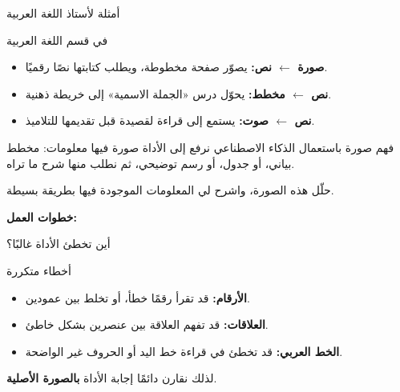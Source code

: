 \documentclass[aspectratio=169, 11pt, xcolor={table}]{beamer}
\begin{document}
\begin{frame}{أمثلة لأستاذ اللغة العربية}
    \begin{tbox}{\faChalkboardTeacher\quad في قسم اللغة العربية}
        \begin{itemize}
            \item \textbf{صورة $\leftarrow$ نص:} يصوّر صفحة مخطوطة، ويطلب كتابتها نصًا رقميًا.
            \item \textbf{نص $\leftarrow$ مخطط:} يحوّل درس «الجملة الاسمية» إلى خريطة ذهنية.
            \item \textbf{نص $\leftarrow$ صوت:} يستمع إلى قراءة لقصيدة قبل تقديمها للتلاميذ.
        \end{itemize}
    \end{tbox}
\end{frame}

\begin{frame}{فهم صورة باستعمال الذكاء الاصطناعي}
    نرفع إلى الأداة صورة فيها معلومات: مخطط بياني، أو جدول، أو رسم توضيحي،
    ثم نطلب منها شرح ما تراه.
    \begin{amr}[brandTeal]
        حلّل هذه الصورة، واشرح لي المعلومات الموجودة فيها بطريقة بسيطة.
    \end{amr}
    \textbf{\color{tealDeep}خطوات العمل:}
    \begin{center}
    \end{center}
\end{frame}

\begin{frame}{أين تخطئ الأداة غالبًا؟}
    \begin{obox}{\faExclamationTriangle\quad أخطاء متكررة}
        \begin{itemize}
            \item \textbf{الأرقام:} قد تقرأ رقمًا خطأ، أو تخلط بين عمودين.
            \item \textbf{العلاقات:} قد تفهم العلاقة بين عنصرين بشكل خاطئ.
            \item \textbf{الخط العربي:} قد تخطئ في قراءة خط اليد أو الحروف غير الواضحة.
        \end{itemize}
    \end{obox}
    لذلك نقارن دائمًا إجابة الأداة \textbf{بالصورة الأصلية}.
\end{frame}
\end{document}
